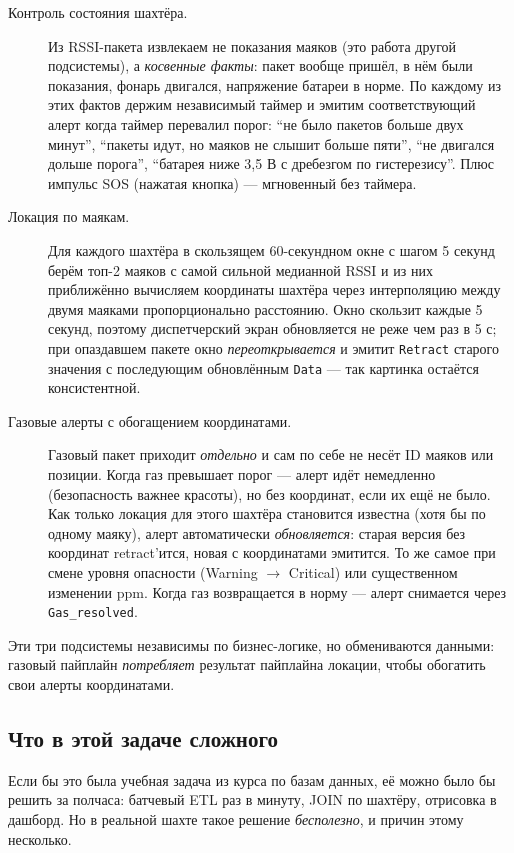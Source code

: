 \begin{description}
\item[Контроль состояния шахтёра.] Из RSSI-пакета извлекаем не
показания маяков (это работа другой подсистемы), а \emph{косвенные
факты}: пакет вообще пришёл, в нём были показания, фонарь двигался,
напряжение батареи в норме. По каждому из этих фактов держим
независимый таймер и эмитим соответствующий алерт когда таймер
перевалил порог: ``не было пакетов больше двух минут'',
``пакеты идут, но маяков не слышит больше пяти'', ``не двигался дольше
порога'', ``батарея ниже 3{,}5 В с дребезгом по гистерезису''.
Плюс импульс SOS (нажатая кнопка) --- мгновенный без таймера.

\item[Локация по маякам.] Для каждого шахтёра в скользящем
60-секундном окне с шагом 5 секунд берём топ-2 маяков с самой сильной
медианной RSSI и из них приближённо вычисляем координаты шахтёра
через интерполяцию между двумя маяками пропорционально расстоянию.
Окно скользит каждые 5 секунд, поэтому диспетчерский экран обновляется
не реже чем раз в 5 с; при опаздавшем пакете окно
\emph{переоткрывается} и эмитит \texttt{Retract} старого значения с
последующим обновлённым \texttt{Data} --- так картинка остаётся
консистентной.

\item[Газовые алерты с обогащением координатами.] Газовый пакет
приходит \emph{отдельно} и сам по себе не несёт ID маяков или
позиции. Когда газ превышает порог --- алерт идёт немедленно
(безопасность важнее красоты), но без координат, если их ещё не было.
Как только локация для этого шахтёра становится известна (хотя бы по
одному маяку), алерт автоматически \emph{обновляется}: старая версия
без координат retract'ится, новая с координатами эмитится. То же самое
при смене уровня опасности (Warning $\to$ Critical) или
существенном изменении ppm. Когда газ возвращается в норму --- алерт
снимается через \texttt{Gas\_resolved}.
\end{description}

Эти три подсистемы независимы по бизнес-логике, но обмениваются
данными: газовый пайплайн \emph{потребляет} результат пайплайна
локации, чтобы обогатить свои алерты координатами.

\subsection{Что в этой задаче сложного}

Если бы это была учебная задача из курса по базам данных, её можно
было бы решить за полчаса: батчевый ETL раз в минуту, JOIN по
шахтёру, отрисовка в дашборд. Но в реальной шахте такое решение
\emph{бесполезно}, и причин этому несколько.

